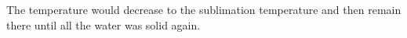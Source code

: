 The temperature would decrease to the sublimation temperature and then remain there until all the water was solid again.